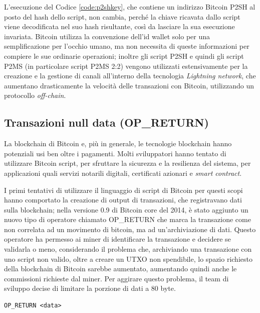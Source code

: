 

L’esecuzione del Codice \ref{code:p2shkey}, che contiene un indirizzo Bitcoin P2SH al posto del hash dello script, non cambia, perché la chiave ricavata dallo script viene decodificata nel suo hash risultante, così da lasciare la sua esecuzione invariata.
Bitcoin utilizza la convenzione dell'id wallet solo per una semplificazione per l'occhio umano, ma non necessita di queste informazioni per compiere le sue ordinarie operazioni; inoltre gli script P2SH e quindi gli script P2MS (in particolare script P2MS 2:2) vengono utilizzati estensivamente per la creazione e la gestione di canali all’interno della tecnologia {\it Lightning network\/}, che aumentano drasticamente la velocità delle transazioni con Bitcoin, utilizzando un protocollo {\it off-chain\/}.

\subsection{Transazioni null data (OP\_RETURN)}\label{sub:sectionNUllaDataScript}
La blockchain di Bitcoin e, più in generale, le tecnologie blockchain hanno potenziali usi ben oltre i pagamenti. Molti sviluppatori hanno tentato di utilizzare Bitcoin script, per sfruttare la sicurezza e la resilienza del sistema, per applicazioni quali servizi notarili digitali, certificati azionari e {\it smart contract\/}.

I primi tentativi di utilizzare il linguaggio di script di Bitcoin per questi scopi hanno comportato la creazione di output di transazioni, che registravano dati sulla blockchain; nella versione 0.9 di Bitcoin core del 2014, è stato aggiunto un nuovo tipo di operatore chiamato OP\_RETURN che marca la transazione come non correlata ad un movimento di bitcoin, ma ad un'archiviazione di dati. Questo operatore ha permesso ai miner di identificare la transazione e decidere se validarla o meno, considerando il problema che, archiviando una transazione con uno script non valido, oltre a creare un UTXO non spendibile, lo spazio richiesto della blockchain di Bitcoin sarebbe aumentato, aumentando quindi anche le commissioni richieste dal miner.
Per aggirare questo problema, il team di sviluppo decise di limitare la porzione di dati a 80 byte.

\begin{lstlisting}[language=bitcoinscript, label={code:nulldata}, caption={Uso dell'operatore OP\_RETURN.}]
OP_RETURN <data>
\end{lstlisting}

